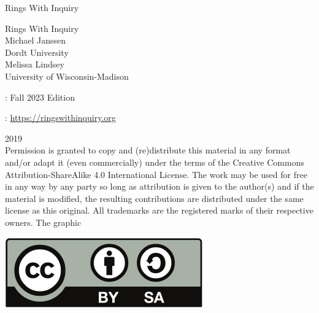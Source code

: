 \documentclass[oneside,10pt,]{book}
\newcommand{\titlepagefont}{\relax}
\numberwithin{equation}{section}
\begin{document}
\raggedbottom
\frontmatter
\thispagestyle{empty}
{\titlepagefont\centering
\vspace*{0.28\textheight}
{\Huge Rings With Inquiry}\\}
\clearpage
\thispagestyle{empty}
{\titlepagefont\centering
\vspace*{0.14\textheight}
{\Huge Rings With Inquiry}\\[3\baselineskip]
{\Large Michael Janssen}\\[0.5\baselineskip]
{\Large Dordt University}\\[3\baselineskip]
{\Large Melissa Lindsey}\\[0.5\baselineskip]
{\Large University of Wisconsin-Madison}\\}
\clearpage
\thispagestyle{empty}
\hypertarget{colophon-root--a-b-b-b}{}
: Fall 2023 Edition\par\medskip
{}: \href{https:\slash{}\slash{}ringswithinquiry.org}{https:\slash{}\slash{}ringswithinquiry.org}\par\medskip
\noindent\textcopyright{}2019\textendash{}\quad{}\\[0.5\baselineskip]
Permission is granted to copy and (re)distribute this material in any format and\slash{}or adapt it (even commercially) under the terms of the Creative Commons Attribution-ShareAlike 4.0 International License.  The work may be used for free in any way by any party so long as attribution is given to the author(s) and if the material is modified, the resulting contributions are distributed under the same license as this original.  All trademarks\texttrademark{} are the registered\textregistered{} marks of their respective owners. The graphic \begin{sidebyside}{1}{0.375}{0.375}{0}%
\begin{sbspanel}{0.25}%
\includegraphics[width=\linewidth]{./images/CC-BY-SA-license.svg}
\end{sbspanel}%
\end{sidebyside}%
\end{document}
